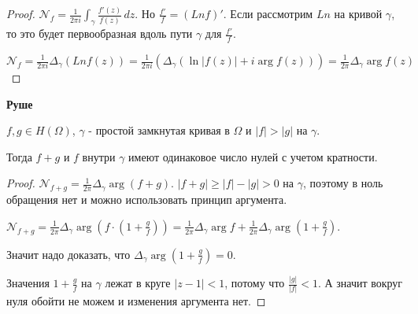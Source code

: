 \begin{proof}
    $\mathcal{N}_f = \frac{1}{2\pi i} \int_{\gamma} \frac{f'(z)}{f(z)} \, dz$. Но $\frac{f'}{f} = (Ln f)'$. 
    Если рассмотрим $Ln$ на кривой $\gamma$, то это будет первообразная вдоль пути $\gamma$ для $\frac{f'}{f}$.

    $\mathcal{N}_f = \frac{1}{2\pi i} \Delta_\gamma (Ln f(z)) = \frac{1}{2 \pi i} (\Delta_\gamma
    (\ln |f(z)| + i\arg f(z))) = \frac{1}{2\pi} \Delta_{\gamma} \arg f(z)$
\end{proof}

\begin{theorem}
    \textbf{Руше}

    $f, g \in H(\Omega)$, $\gamma$ - простой замкнутая кривая в $\Omega$ и 
    $|f| > |g|$ на $\gamma$.

    Тогда $f + g$ и $f$ внутри $\gamma$ имеют одинаковое число нулей с учетом кратности.
\end{theorem}

\begin{proof}
    $\mathcal{N}_{f + g} = \frac{1}{2 \pi} \Delta_\gamma \arg (f + g)$.
    $|f + g| \geqslant |f| - |g| > 0$ на $\gamma$, поэтому в ноль обращения нет и
    можно использовать принцип аргумента.

    $\mathcal{N}_{f + g} = \frac{1}{2\pi} \Delta_\gamma \arg (f \cdot (1 + \frac{g}{f})) = 
    \frac{1}{2\pi} \Delta_\gamma \arg f + \frac{1}{2\pi} \Delta_\gamma \arg (1 + \frac{g}{f})$.

    Значит надо доказать, что $\Delta_\gamma \arg (1 + \frac{g}{f}) = 0$.

    Значения $1 + \frac{g}{f}$ на $\gamma$ лежат в круге $|z - 1| < 1$, потому что $\frac{|g|}{|f|} < 1$. А значит
    вокруг нуля обойти не можем и изменения аргумента нет.
\end{proof}

